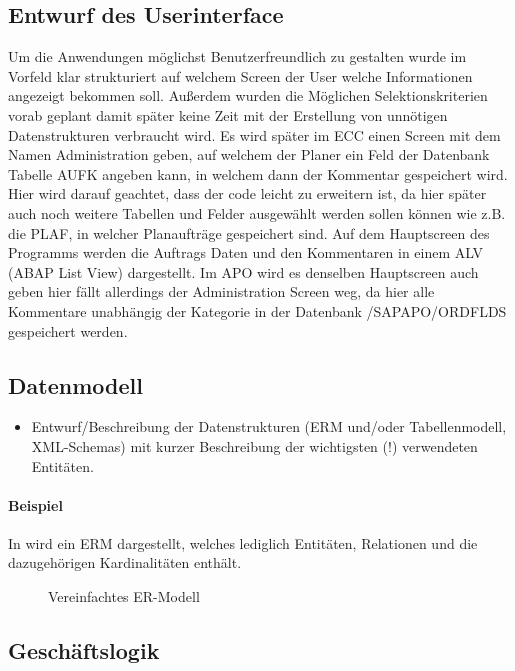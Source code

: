 \subsection{Entwurf des Userinterface}
\label{sec:Benutzeroberflaeche} 
Um die Anwendungen möglichst Benutzerfreundlich zu gestalten wurde im Vorfeld klar strukturiert auf welchem Screen der User welche Informationen angezeigt bekommen soll. Außerdem wurden die Möglichen Selektionskriterien vorab geplant damit später keine Zeit mit der Erstellung von unnötigen Datenstrukturen verbraucht wird. Es wird später im ECC einen Screen mit dem Namen Administration geben, auf welchem der Planer ein Feld der Datenbank Tabelle AUFK angeben kann, in welchem dann der Kommentar gespeichert wird. Hier wird darauf geachtet, dass der code leicht zu erweitern ist, da hier später auch noch weitere Tabellen und Felder ausgewählt werden sollen können wie z.B. die PLAF, in welcher Planaufträge gespeichert sind. Auf dem Hauptscreen des Programms werden die Auftrags Daten und den Kommentaren in einem ALV (ABAP List View) dargestellt. Im APO wird es denselben Hauptscreen auch geben hier fällt allerdings der Administration Screen weg, da hier alle Kommentare unabhängig der Kategorie in der Datenbank /SAPAPO/ORDFLDS gespeichert werden. 

\subsection{Datenmodell}
\label{sec:Datenmodell}

\begin{itemize}
	\item Entwurf/Beschreibung der Datenstrukturen (\zB \acs{ERM} und/oder Tabellenmodell, \acs{XML}-Schemas) mit kurzer Beschreibung der wichtigsten (!) verwendeten Entitäten.
\end{itemize}

\paragraph{Beispiel}
In  wird ein \ac{ERM} dargestellt, welches lediglich Entitäten, Relationen und die dazugehörigen Kardinalitäten enthält. 

\begin{figure}[htb]
\centering
{}
\caption{Vereinfachtes ER-Modell}
\label{fig:ER}
\end{figure} 


\subsection{Geschäftslogik}
\label{sec:Geschaeftslogik}

